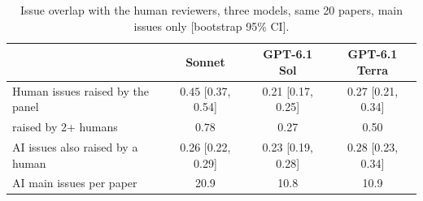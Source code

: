 \documentclass[11pt,a4paper]{article}
\begin{document}
\begin{table}[h]
\centering
\small
\caption{Issue overlap with the human reviewers, three models, same 20 papers, main issues only
[bootstrap 95\% CI].}\label{tab:gptoverlap}
\begin{tabular}{lccc}
\toprule
 & Sonnet & GPT-6.1 Sol & GPT-6.1 Terra\\
\midrule
Human issues raised by the panel & $\mathbf{0.45}$ [0.37, 0.54] & 0.21 [0.17, 0.25] & 0.27 [0.21, 0.34]\\
\quad raised by 2+ humans & $\mathbf{0.78}$ & 0.27 & 0.50\\
AI issues also raised by a human & 0.26 [0.22, 0.29] & 0.23 [0.19, 0.28] & $\mathbf{0.28}$ [0.23, 0.34]\\
AI main issues per paper & 20.9 & 10.8 & 10.9\\
\bottomrule
\end{tabular}
\end{table}
\end{document}
